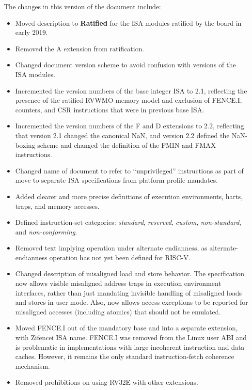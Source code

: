 The changes in this version of the document include:
\vspace{-0.2in}
\begin{itemize}
\parskip 0pt
\itemsep 1pt
\item Moved description to {\bf Ratified} for the  ISA modules ratified
  by the board in early 2019.
\item Removed the A extension from ratification.
\item Changed document version scheme to avoid confusion with versions
  of the ISA modules.
\item Incremented the version numbers of the base integer ISA to 2.1,
  reflecting the presence of the ratified RVWMO memory model and
  exclusion of FENCE.I, counters, and CSR instructions that were in
  previous base ISA.
\item Incremented the version numbers of the F and D extensions to 2.2,
  reflecting that version 2.1 changed the canonical NaN, and version
  2.2 defined the NaN-boxing scheme and changed the definition of the
  FMIN and FMAX instructions.
\item Changed name of document to refer to ``unprivileged''
  instructions as part of move to separate ISA specifications from
  platform profile mandates.
\item Added clearer and more precise definitions of execution
  environments, harts, traps, and memory accesses.
\item Defined instruction-set categories: {\em standard}, {\em
  reserved}, {\em custom}, {\em non-standard}, and {\em
  non-conforming}.
\item Removed text implying operation under alternate endianness, as
  alternate-endianness operation has not yet been defined for RISC-V.
\item Changed description of misaligned load and store behavior.  The
  specification now allows visible misaligned address traps in
  execution environment interfaces, rather than just mandating
  invisible handling of misaligned loads and stores in user mode.
  Also, now allows access exceptions to be reported for misaligned
  accesses (including atomics) that should not be emulated. 
\item Moved FENCE.I out of the mandatory base and into a separate extension,
  with Zifencei ISA name.  FENCE.I was removed from the Linux user ABI and is
  problematic in implementations with large incoherent instruction and
  data caches.  However, it remains the only standard
  instruction-fetch coherence mechanism.
\item Removed prohibitions on using RV32E with other extensions.

\end{itemize}
